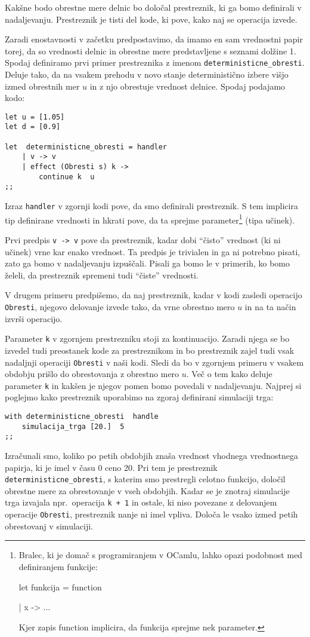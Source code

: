 \documentclass[a4paper,12pt]{article}
\theoremstyle{definition} %
\begin{document}
Kakšne bodo obrestne mere delnic bo določal prestreznik, ki ga bomo definirali v nadaljevanju. Prestreznik je tisti del kode, ki pove, kako naj se operacija izvede.

Zaradi enostavnosti v začetku predpostavimo, da imamo en sam vrednostni papir torej, da so vrednosti delnic in obrestne mere predstavljene s seznami dolžine 1. Spodaj definiramo prvi primer prestreznika z imenom \lstinline{deterministicne_obresti}. Deluje tako, da na vsakem prehodu v novo stanje deterministično izbere višjo izmed obrestnih mer $u$ in z njo obrestuje vrednost delnice. Spodaj podajamo kodo:
\begin{lstlisting}
let u = [1.05]
let d = [0.9]

let  deterministicne_obresti = handler
	| v -> v
	| effect (Obresti s) k ->
		continue k  u
;;
\end{lstlisting}
Izraz \lstinline{handler} v zgornji kodi pove, da smo definirali prestreznik. S tem implicira  tip definirane vrednosti in hkrati pove, da   ta sprejme parameter\footnote{Bralec, ki je domač s programiranjem v OCamlu, lahko opazi podobnost med definiranjem funkcije: 

let funkcija = function 

           | x -> ...

Kjer zapis function implicira, da funkcija sprejme nek parameter.} (tipa učinek).

Prvi predpis \lstinline{v -> v} pove da prestreznik, kadar dobi "`čisto"' vrednost (ki ni učinek) vrne kar enako vrednost. Ta predpis je trivialen in ga ni potrebno pisati, zato ga bomo v nadaljevanju izpuščali. Pisali ga bomo le v primerih, ko bomo želeli, da prestreznik spremeni tudi "`čiste"' vrednosti. 

 V drugem primeru predpišemo, da naj prestreznik, kadar v kodi zasledi operacijo \lstinline{Obresti}, njegovo delovanje izvede tako, da vrne obrestno mero $u$ in na ta način izvrši operacijo. 

Parameter \lstinline{k} v zgornjem prestrezniku stoji za kontinuacijo. Zaradi njega se bo izvedel tudi preostanek kode za prestreznikom in bo prestreznik zajel tudi vsak nadaljnji operaciji \lstinline{Obresti} v naši kodi. Sledi da bo v zgornjem primeru v vsakem obdobju prišlo do obrestovanja z obrestno mero $u$. Več o tem kako deluje parameter \lstinline{k} in kakšen je njegov pomen bomo povedali v nadaljevanju. Najprej si poglejmo kako prestreznik uporabimo na zgoraj definirani simulaciji trga:
\begin{lstlisting}
with deterministicne_obresti  handle
	simulacija_trga [20.]  5
;;
\end{lstlisting}
Izračunali smo, koliko po petih obdobjih znaša vrednost vhodnega vrednostnega papirja, ki je imel v času 0 ceno 20. Pri tem je prestreznik \lstinline{deterministicne_obresti}, s katerim smo prestregli celotno funkcijo, določil obrestne mere za obrestovanje v vseh obdobjih. Kadar se je znotraj simulacije trga izvajala npr.\ operacija \lstinline{k + 1} in ostale, ki niso povezane z delovanjem operacije \lstinline{Obresti}, prestreznik nanje ni imel vpliva. Določa le vsako izmed petih obrestovanj v simulaciji. 
\end{document}
